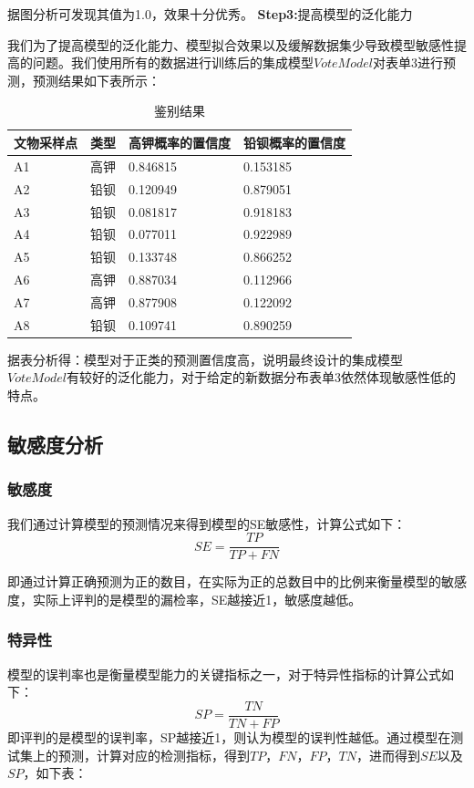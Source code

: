 \documentclass[UTF8]{ctexart}
\begin{document}
据图分析可发现其值为1.0，效果十分优秀。
\textbf{Step3:}提高模型的泛化能力

我们为了提高模型的泛化能力、模型拟合效果以及缓解数据集少导致模型敏感性提高的问题。我们使用所有的数据进行训练后的集成模型$VoteModel$对表单3进行预测，预测结果如下表所示：

\begin{table}[H]
    \centering
	\caption{鉴别结果}
    \begin{tabular}{|l|l|l|l|}
    \hline
        文物采样点 & 类型 & 高钾概率的置信度 & 铅钡概率的置信度 \\ \hline
        A1 & 高钾 & 0.846815 & 0.153185 \\ \hline
        A2 & 铅钡 & 0.120949 & 0.879051 \\ \hline
        A3 & 铅钡 & 0.081817 & 0.918183 \\ \hline
        A4 & 铅钡 & 0.077011 & 0.922989 \\ \hline
        A5 & 铅钡 & 0.133748 & 0.866252 \\ \hline
        A6 & 高钾 & 0.887034 & 0.112966 \\ \hline
        A7 & 高钾 & 0.877908 & 0.122092 \\ \hline
        A8 & 铅钡 & 0.109741 & 0.890259 \\ \hline
    \end{tabular}
\end{table}
据表分析得：模型对于正类的预测置信度高，说明最终设计的集成模型$VoteModel有$较好的泛化能力，对于给定的新数据分布表单3依然体现敏感性低的特点。

\subsection{敏感度分析}
\subsubsection{敏感度}
我们通过计算模型的预测情况来得到模型的SE敏感性，计算公式如下：
\begin{equation}
    SE=\frac{TP}{TP+FN}
\end{equation}

即通过计算正确预测为正的数目，在实际为正的总数目中的比例来衡量模型的敏感度，实际上评判的是模型的漏检率，SE越接近1，敏感度越低。

\subsubsection{特异性}
模型的误判率也是衡量模型能力的关键指标之一，对于特异性指标的计算公式如下：
\begin{equation}
    SP=\frac{TN}{TN+FP}
\end{equation}
即评判的是模型的误判率，SP越接近1，则认为模型的误判性越低。通过模型在测试集上的预测，计算对应的检测指标，得到$TP$，$FN$，$FP$，$TN$，进而得到$SE$以及$SP$，如下表：
\end{document}
